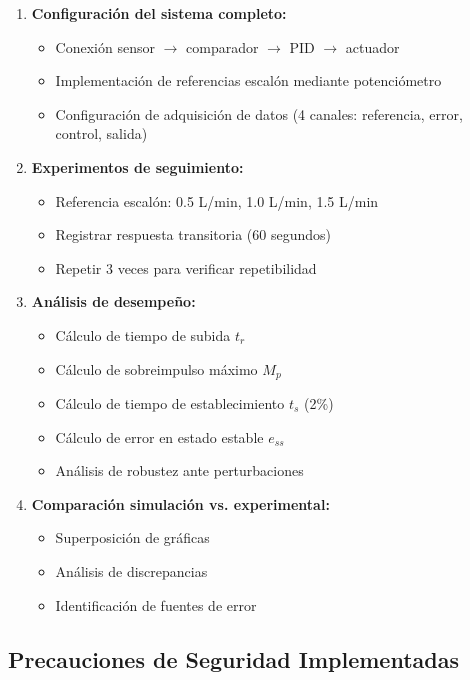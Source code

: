 \documentclass[conference]{IEEEtran}
\begin{document}
\begin{enumerate}
\item \textbf{Configuración del sistema completo:}
\begin{itemize}
\item Conexión sensor $\rightarrow$ comparador $\rightarrow$ PID $\rightarrow$ actuador
\item Implementación de referencias escalón mediante potenciómetro
\item Configuración de adquisición de datos (4 canales: referencia, error, control, salida)
\end{itemize}

\item \textbf{Experimentos de seguimiento:}
\begin{itemize}
\item Referencia escalón: 0.5 L/min, 1.0 L/min, 1.5 L/min
\item Registrar respuesta transitoria (60 segundos)
\item Repetir 3 veces para verificar repetibilidad
\end{itemize}

\item \textbf{Análisis de desempeño:}
\begin{itemize}
\item Cálculo de tiempo de subida $t_r$
\item Cálculo de sobreimpulso máximo $M_p$
\item Cálculo de tiempo de establecimiento $t_s$ (2\%)
\item Cálculo de error en estado estable $e_{ss}$
\item Análisis de robustez ante perturbaciones
\end{itemize}

\item \textbf{Comparación simulación vs. experimental:}
\begin{itemize}
\item Superposición de gráficas
\item Análisis de discrepancias
\item Identificación de fuentes de error
\end{itemize}
\end{enumerate}

\subsection{Precauciones de Seguridad Implementadas}
\end{document}
